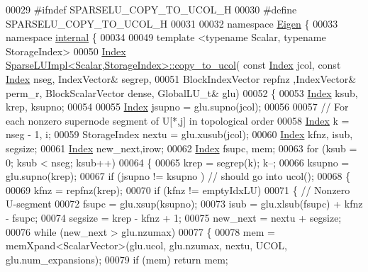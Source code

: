\begin{DoxyCode}
00029 \textcolor{preprocessor}{#ifndef SPARSELU\_COPY\_TO\_UCOL\_H}
00030 \textcolor{preprocessor}{#define SPARSELU\_COPY\_TO\_UCOL\_H}
00031 
00032 \textcolor{keyword}{namespace }\hyperlink{namespace_eigen}{Eigen} \{
00033 \textcolor{keyword}{namespace }\hyperlink{namespaceinternal}{internal} \{
00034 
00049 \textcolor{keyword}{template} <\textcolor{keyword}{typename} Scalar, \textcolor{keyword}{typename} StorageIndex>
00050 \hyperlink{namespace_eigen_a62e77e0933482dafde8fe197d9a2cfde}{Index} \hyperlink{group___sparse_l_u___module_ae4867ed1d5f104f9245411c356416a21}{SparseLUImpl<Scalar,StorageIndex>::copy\_to\_ucol}(\textcolor{keyword}{
      const} \hyperlink{namespace_eigen_a62e77e0933482dafde8fe197d9a2cfde}{Index} jcol, \textcolor{keyword}{const} \hyperlink{namespace_eigen_a62e77e0933482dafde8fe197d9a2cfde}{Index} nseg, IndexVector& segrep,
00051                                                       BlockIndexVector repfnz ,IndexVector& perm\_r, 
      BlockScalarVector dense, GlobalLU\_t& glu)
00052 \{  
00053   \hyperlink{namespace_eigen_a62e77e0933482dafde8fe197d9a2cfde}{Index} ksub, krep, ksupno; 
00054     
00055   \hyperlink{namespace_eigen_a62e77e0933482dafde8fe197d9a2cfde}{Index} jsupno = glu.supno(jcol);
00056   
00057   \textcolor{comment}{// For each nonzero supernode segment of U[*,j] in topological order }
00058   \hyperlink{namespace_eigen_a62e77e0933482dafde8fe197d9a2cfde}{Index} k = nseg - 1, i; 
00059   StorageIndex nextu = glu.xusub(jcol); 
00060   \hyperlink{namespace_eigen_a62e77e0933482dafde8fe197d9a2cfde}{Index} kfnz, isub, segsize; 
00061   \hyperlink{namespace_eigen_a62e77e0933482dafde8fe197d9a2cfde}{Index} new\_next,irow; 
00062   \hyperlink{namespace_eigen_a62e77e0933482dafde8fe197d9a2cfde}{Index} fsupc, mem; 
00063   \textcolor{keywordflow}{for} (ksub = 0; ksub < nseg; ksub++)
00064   \{
00065     krep = segrep(k); k--; 
00066     ksupno = glu.supno(krep); 
00067     \textcolor{keywordflow}{if} (jsupno != ksupno ) \textcolor{comment}{// should go into ucol(); }
00068     \{
00069       kfnz = repfnz(krep); 
00070       \textcolor{keywordflow}{if} (kfnz != emptyIdxLU)
00071       \{ \textcolor{comment}{// Nonzero U-segment }
00072         fsupc = glu.xsup(ksupno); 
00073         isub = glu.xlsub(fsupc) + kfnz - fsupc; 
00074         segsize = krep - kfnz + 1; 
00075         new\_next = nextu + segsize; 
00076         \textcolor{keywordflow}{while} (new\_next > glu.nzumax) 
00077         \{
00078           mem = memXpand<ScalarVector>(glu.ucol, glu.nzumax, nextu, UCOL, glu.num\_expansions); 
00079           \textcolor{keywordflow}{if} (mem) \textcolor{keywordflow}{return} mem; 

\end{DoxyCode}
